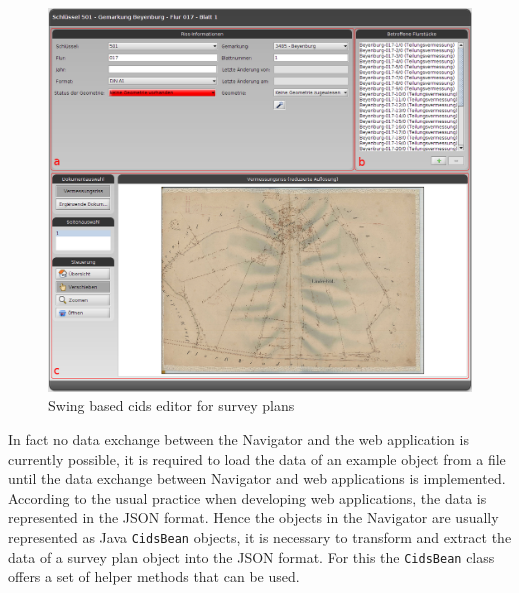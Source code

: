 \begin{figure}
	\centering	\includegraphics[width=1.0\textwidth]{./img/impl/survey_plan_editor_old.png}
	\caption{Swing based cids editor for survey plans}
	\label{fig:survey_plan_swing_editor}
\end{figure}

In fact no data exchange between the Navigator and the web application is currently possible, it is required to load the data of an example object from a file until the data exchange between Navigator and web applications is implemented.
According to the usual practice when developing web applications, the data is represented in the JSON format.
Hence the objects in the Navigator are usually represented as Java \texttt{CidsBean} objects, it is necessary to transform and extract the data of a survey plan object into the JSON format.
For this the \texttt{CidsBean} class offers a set of helper methods that can be used.  





